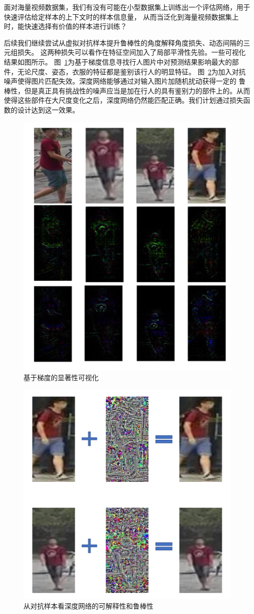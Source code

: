 面对海量视频数据集，我们有没有可能在小型数据集上训练出一个评估网络，用于快速评估给定样本的上下文时的样本信息量，
从而当泛化到海量视频数据集上时，能快速选择有价值的样本进行训练？%


后续我们继续尝试从虚拟对抗样本提升鲁棒性的角度解释角度损失、动态间隔的三元组损失。
这两种损失可以看作在特征空间加入了局部平滑性先验。一些可视化结果如图所示。
图~\ref{fig:grad}为基于梯度信息寻找行人图片中对预测结果影响最大的部件，无论尺度、姿态，衣服的特征都是鉴别该行人的明显特征。
图~\ref{fig:adv}为加入对抗噪声使得图片匹配失效。深度网络能够通过对输入图片加随机扰动获得一定的
鲁棒性，但是真正具有挑战性的噪声应当是加在行人的具有鉴别力的部件上的。从而使得这些部件在大尺度变化之后，深度网络仍然能匹配正确。我们计划通过损失函数的设计达到这一效果。

\begin{figure}
	\centering
	\includegraphics[width=.7\textwidth]{fig/2018-05-21-09-58-23.png}
	\caption{基于梯度的显著性可视化}\label{fig:grad}
\end{figure}

\begin{figure}
	\centering
	\includegraphics[width=.8\textwidth]{fig/2018-05-21-10-31-13.png}
	\caption{从对抗样本看深度网络的可解释性和鲁棒性}\label{fig:adv}
\end{figure}

\printbibliography[heading=chapbib]
